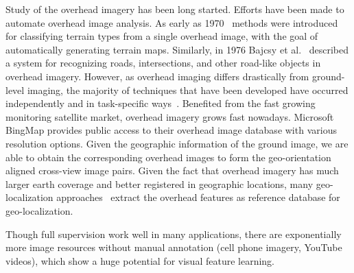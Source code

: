 Study of the overhead imagery has been long started.
Efforts have been made to automate overhead image analysis. As early
as 1970~\cite{idelsohn1970learning} methods were introduced for
classifying terrain types from a single overhead image, with the goal
of automatically generating terrain maps.  Similarly, in 1976 Bajcsy
et al.~\cite{bajcsy1976computer} described a system for recognizing
roads, intersections, and other road-like objects in overhead imagery.
However, as overhead imaging differs drastically from ground-level
imaging, the majority of techniques that have been developed have
occurred independently and in task-specific ways~\cite{Rozen}.
Benefited from the fast growing monitoring satellite market, overhead
imagery grows fast nowadays. Microsoft BingMap provides public access
to their overhead image database with various resolution options.
Given the geographic information of the ground image, we are able to
obtain the corresponding overhead images to form the geo-orientation
aligned cross-view image pairs.
%
Given the fact that overhead imagery has much larger earth coverage
and better registered in geographic locations, many geo-localization
approaches~\cite{lin2013cross,lin2015learning,workman2015geocnn,workman2015wide}
extract the overhead features as reference database for
geo-localization.



Though full supervision work well in many applications, there are
exponentially more image resources without manual annotation (cell
phone imagery, YouTube videos\etc), which show a huge potential for
visual feature learning.   
